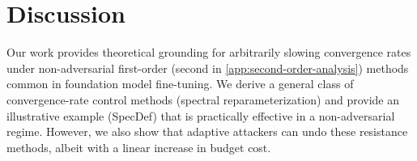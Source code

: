 \documentclass{article}
\theoremstyle{plain}
\theoremstyle{definition}
\theoremstyle{remark}
\begin{document}
\begin{table}[htbp]
\centering
\caption{Layer injection attack validates \cref{thm:layer-injection-attack}: adding $k{-}1$ layers reduces effective resistance from $\alpha$ to $\alpha^{1/k}$, restoring convergence at linear cost in parameters.}
\label{tab:injection-attack}
\begin{sc}
\end{sc}
\end{table}
% 
\section{Discussion}
\label{sec:discussion}
Our work provides theoretical grounding for arbitrarily slowing convergence rates under non-adversarial first-order (second in \cref{app:second-order-analysis}) 
methods common in foundation model fine-tuning. We derive a general class of convergence-rate control methods (spectral reparameterization) and provide an illustrative example (SpecDef) that is practically effective in a non-adversarial regime. However, we also show that adaptive attackers can undo these resistance methods, albeit with a linear increase in budget cost.

\vspace{-1em}
\end{document}
